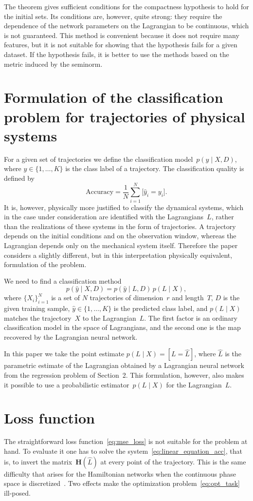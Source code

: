 \documentclass[sn-mathphys-num]{sn-jnl}
\theoremstyle{thmstylethree}
\theoremstyle{thmstyletwo}
\theoremstyle{thmstyleone}
\begin{document}
The theorem gives sufficient conditions for the compactness hypothesis to hold for the initial
sets. Its conditions are, however, quite strong: they require the dependence of the network parameters on the Lagrangian to be continuous, which is not guaranteed. This method is convenient because it does not require many features, but it is not suitable for showing that the hypothesis fails for a given dataset. If the hypothesis fails, it is better to use the methods based on the metric induced by the seminorm.


\section{Formulation of the classification problem for trajectories of physical systems} \label{sec:classification}
For a given set of trajectories we define the classification model~$p({y} \mid X, D)$, where ${y} \in \{1,\dots,K\}$ is the class label of a trajectory. The classification quality is defined by
\[
\text{Accuracy} = \frac{1}{N} \sum_{i = 1}^N \bigl[\hat{y}_i = y_i\bigr].
\]
It is, however, physically more justified to classify the dynamical systems, which in the case under consideration are identified with the Lagrangians~$L$, rather than the realizations of these systems in the form of trajectories. A trajectory depends on the initial conditions and on the observation window, whereas the Lagrangian depends only on the mechanical system itself. Therefore the paper considers a slightly different, but in this interpretation physically equivalent, formulation of the problem.

We need to find a classification method
\[
p(\hat{y} \mid X, D) = p(\hat{y} \mid L, D)\, p(L \mid X),
\]
where $\{X_i\}_{i=1}^N$ is a set of $N$ trajectories of dimension~$r$ and length~$T$, $D$ is the given training sample, $\hat{y} \in \{1,\dots, K\}$ is the predicted class label, and $p(L \mid X)$ matches the trajectory~$X$ to the Lagrangian~$L$. The first factor is an ordinary classification model in the space of Lagrangians, and the second one is the map recovered by the Lagrangian neural network.

In this paper we take the point estimate $p(L \mid X) = [L = \hat{L}]$, where $\hat{L}$ is the parametric estimate of the Lagrangian obtained by a Lagrangian neural network from the regression problem of Section~2. This formulation, however, also makes it possible to use a probabilistic estimator~$p(L \mid X)$ for the Lagrangian~$L$.

\section{Loss function} \label{sec:loss}
The straightforward loss function~\eqref{eq:mse_loss} is not suitable for the problem at hand. To evaluate it one has to solve the system~\eqref{eq:linear_equation_acc}, that is, to invert the matrix~$\mathbf{H}(\hat{L})$ at every point of the trajectory. This is the same difficulty that arises for the Hamiltonian networks when the continuous phase space is discretized~\cite{HNNnonvangrad}. Two effects make the optimization problem~\eqref{eq:opt_task} ill-posed.
\end{document}
